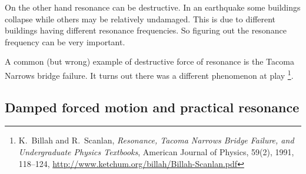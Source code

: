 On the other hand resonance can be destructive.
In an earthquake some buildings collapse while
others may be relatively undamaged.  This is due to different buildings
having different resonance frequencies.  So figuring out the resonance
frequency can be very important.

A common (but wrong) example of destructive force of resonance is the Tacoma
Narrows bridge failure.  It turns out there was a different
phenomenon at play%
\footnote{K.\ Billah and R.\ Scanlan, \emph{Resonance, Tacoma Narrows
Bridge Failure, and Undergraduate Physics Textbooks}, American Journal of
Physics, 59(2), 1991, 118--124,
\url{http://www.ketchum.org/billah/Billah-Scanlan.pdf}}.

\subsection{Damped forced motion and practical resonance}

